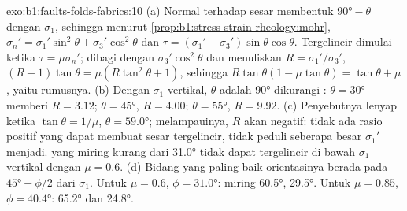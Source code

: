 \begin{solution}{exo:b1:faults-folds-fabrics:10}
(a) Normal terhadap sesar membentuk $\ang{90} - \theta$ dengan $\sigma_1$, sehingga menurut \cref{prop:b1:stress-strain-rheology:mohr}, $\sigma_n' = \sigma_1'\sin^2\theta + \sigma_3'\cos^2\theta$ dan $\tau = (\sigma_1' - \sigma_3')\sin\theta\cos\theta$. Tergelincir dimulai ketika $\tau = \mu\sigma_n'$; dibagi dengan $\sigma_3'\cos^2\theta$ dan menuliskan $R = \sigma_1'/\sigma_3'$,
$(R - 1)\tan\theta = \mu(R\tan^2\theta + 1)$, sehingga $R\tan\theta(1 - \mu\tan\theta) = \tan\theta + \mu$, yaitu rumusnya.
(b) Dengan $\sigma_1$ vertikal, $\theta$ adalah \ang{90} dikurangi : $\theta = \ang{30}$ memberi $R = 3.12$;
$\theta = \ang{45}$,
$R = 4.00$;
$\theta = \ang{55}$,
$R = 9.92$. (c) Penyebutnya lenyap ketika $\tan\theta = 1/\mu$,
$\theta = \ang{59.0}$; melampauinya, $R$ akan negatif: tidak ada rasio  positif yang dapat membuat sesar tergelincir, tidak peduli seberapa besar $\sigma_1'$ menjadi.  yang miring kurang dari \ang{31.0} tidak dapat tergelincir di bawah $\sigma_1$ vertikal dengan $\mu = 0.6$. (d) Bidang yang paling baik orientasinya berada pada $\ang{45} - \phi/2$ dari $\sigma_1$. Untuk $\mu = 0.6$,
$\phi = \ang{31.0}$:  miring \ang{60.5},  \ang{29.5}. Untuk $\mu = 0.85$,
$\phi = \ang{40.4}$: \ang{65.2} dan \ang{24.8}.
\end{solution}

